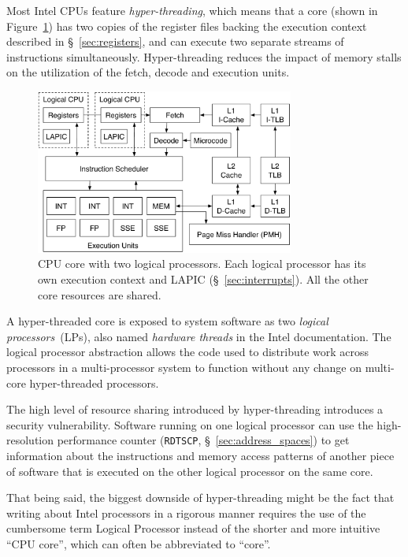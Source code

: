 Most Intel CPUs feature \textit{hyper-threading}, which means that a core
(shown in Figure~\ref{fig:cpu_core}) has two copies of the register files
backing the execution context described in \S~\ref{sec:registers}, and can
execute two separate streams of instructions simultaneously. Hyper-threading
reduces the impact of memory stalls on the utilization of the fetch, decode and
execution units.

\begin{figure}[hbt]
  \centering
  \includegraphics[width=85mm]{figures/cpu_core.pdf}
  \caption{
    CPU core with two logical processors. Each logical processor has its own
    execution context and LAPIC (\S~\ref{sec:interrupts}). All the other core
    resources are shared.
  }
  \label{fig:cpu_core}
\end{figure}

A hyper-threaded core is exposed to system software as two \textit{logical
processors}~(LPs), also named \textit{hardware threads} in the Intel
documentation. The logical processor abstraction allows the code used to
distribute work across processors in a multi-processor system to function
without any change on multi-core hyper-threaded processors.

The high level of resource sharing introduced by hyper-threading introduces a
security vulnerability. Software running on one logical processor can use the
high-resolution performance counter (\texttt{RDTSCP},
\S~\ref{sec:address_spaces}) \cite{petters1999making} to get information about
the instructions and memory access patterns of another piece of software that
is executed on the other logical processor on the same core.

That being said, the biggest downside of hyper-threading might be the fact that
writing about Intel processors in a rigorous manner requires the use of the
cumbersome term Logical Processor instead of the shorter and more intuitive
``CPU core'', which can often be abbreviated to ``core''.

